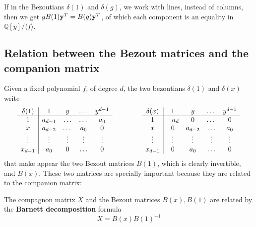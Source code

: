 \documentclass{standalone}
\begin{document}
\begin{rem}
If in the Bezoutians $\delta(1)$ and $\delta(g)$, we work with lines, instead of columns, then we get $gB(1)\bold{y}^T = B(g)\bold{y}^T$, of which each component is an equality in $\mathbb{Q}[y]/\langle f \rangle$.
\end{rem}


\subsection{Relation between the Bezout matrices and the companion matrix}
\label{Bar}
Given a fixed polynomial $f$, of degree $d$, the two bezoutians $\delta(1)$ and $\delta(x)$ write
\begin{equation}
	\begin{array}{c|cccc}
		\delta(1) & 1 & y & \dots & y^{d-1} \\
		\hline
		1 & a_{d-1} & \ldots & \dots & a_0 \\
		x & a_{d-2} & \dots & a_0 & 0 \\
		\vdots & \vdots & \vdots & \vdots & \vdots \\
		x_{d-1} & a_0 & 0 & \ldots & 0 \\
	\end{array}
	\hspace{1.5cm}
	\begin{array}{c|cccc}
		\delta(x) & 1 & y & \dots & y^{d-1} \\
		\hline
		1 & -a_{d} & 0 & \dots & 0 \\
		x & 0 & a_{d-2} & \ldots & a_0 \\
		\vdots & \vdots & \vdots & \vdots & \vdots \\
		x_{d-1} & 0 & a_0 & \ldots & 0 \\
	\end{array}
\end{equation}
that make appear the two Bezout matrices $B(1)$, which is clearly invertible, and $B(x)$. 
These two matrices are specially important because they are related to the companion matrix:
\begin{prop}
\label{Barnett}
The compagnon matrix $X$ and the Bezout matrices $B(x), B(1)$ are related by the {\bf Barnett decomposition} formula
\cite{Barnett}
\begin{equation}
	X = B(x)B(1)^{-1}
\end{equation}
\end{prop}
\end{document}
